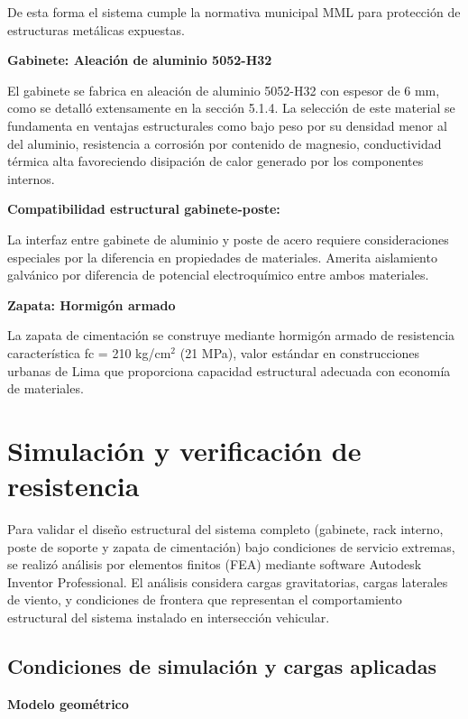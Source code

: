 \documentclass[12pt,a4paper,oneside]{report}
\begin{document}
De esta forma el sistema cumple la normativa municipal MML para protección de estructuras metálicas expuestas.

\textbf{Gabinete: Aleación de aluminio 5052-H32}

El gabinete se fabrica en aleación de aluminio 5052-H32 con espesor de 6 mm, como se detalló extensamente en la sección 5.1.4. La selección de este material se fundamenta en ventajas estructurales como bajo peso por su densidad menor al del aluminio, resistencia a corrosión por contenido de magnesio, conductividad térmica alta favoreciendo disipación de calor generado por los componentes internos.

\textbf{Compatibilidad estructural gabinete-poste:}

La interfaz entre gabinete de aluminio y poste de acero requiere consideraciones especiales por la diferencia en propiedades de materiales. Amerita aislamiento galvánico por diferencia de potencial electroquímico entre ambos materiales.

\textbf{Zapata: Hormigón armado}

La zapata de cimentación se construye mediante hormigón armado de resistencia característica f\textquotesingle c = 210 kg/cm\ensuremath{^{2}} (21 MPa), valor estándar en construcciones urbanas de Lima que proporciona capacidad estructural adecuada con economía de materiales.

\section{Simulación y verificación de resistencia}\label{simulaciuxf3n-y-verificaciuxf3n-de-resistencia}

Para validar el diseño estructural del sistema completo (gabinete, rack interno, poste de soporte y zapata de cimentación) bajo condiciones de servicio extremas, se realizó análisis por elementos finitos (FEA) mediante software Autodesk Inventor Professional. El análisis considera cargas gravitatorias, cargas laterales de viento, y condiciones de frontera que representan el comportamiento estructural del sistema instalado en intersección vehicular.

\subsection{Condiciones de simulación y cargas aplicadas}\label{condiciones-de-simulaciuxf3n-y-cargas-aplicadas}

\textbf{Modelo geométrico}
\end{document}
